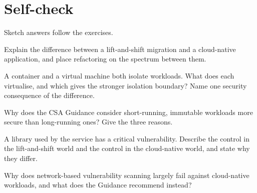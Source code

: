 \section*{Self-check}

Sketch answers follow the exercises.

\begin{exercise}
Explain the difference between a lift-and-shift migration and a cloud-native
application, and place refactoring on the spectrum between them.
\end{exercise}

\begin{exercise}
A container and a virtual machine both isolate workloads. What does each
virtualise, and which gives the stronger isolation boundary? Name one security
consequence of the difference.
\end{exercise}

\begin{exercise}
Why does the CSA Guidance consider short-running, immutable workloads more
secure than long-running ones? Give the three reasons.
\end{exercise}

\begin{exercise}
A library used by the service has a critical vulnerability. Describe the
control in the lift-and-shift world and the control in the cloud-native world,
and state why they differ.
\end{exercise}

\begin{exercise}
Why does network-based vulnerability scanning largely fail against
cloud-native workloads, and what does the Guidance recommend instead?
\end{exercise}

